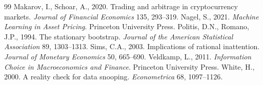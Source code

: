 \documentclass[12pt]{article}
\begin{document}
\begin{thebibliography}{99}
 Makarov, I., Schoar, A., 2020. Trading and arbitrage in cryptocurrency markets. \textit{Journal of Financial Economics} 135, 293--319.
 Nagel, S., 2021. \textit{Machine Learning in Asset Pricing}. Princeton University Press.
 Politis, D.N., Romano, J.P., 1994. The stationary bootstrap. \textit{Journal of the American Statistical Association} 89, 1303--1313.
 Sims, C.A., 2003. Implications of rational inattention. \textit{Journal of Monetary Economics} 50, 665--690.
 Veldkamp, L., 2011. \textit{Information Choice in Macroeconomics and Finance}. Princeton University Press.
 White, H., 2000. A reality check for data snooping. \textit{Econometrica} 68, 1097--1126.
\end{thebibliography}
\end{document}
